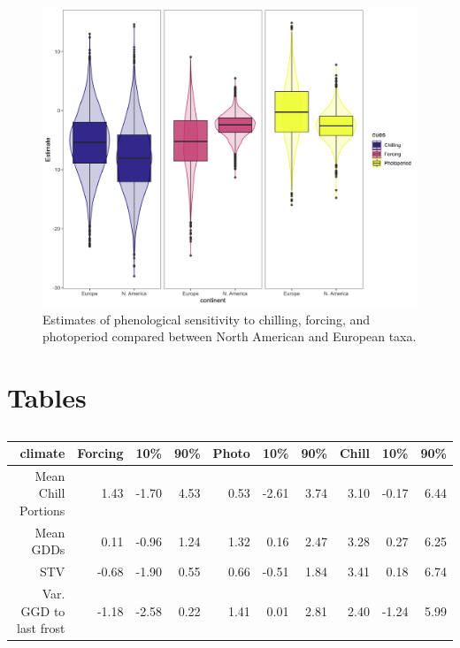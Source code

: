 \documentclass[12pt]{article}\usepackage[]{graphicx}\usepackage[]{color}
\begin{document}
\begin{figure}[h!]
    \centering
 \includegraphics[width=\textwidth]{..//..//analyses/ranges/figures/ontinental_cues.jpeg} 
    \caption{Estimates of phenological sensitivity to chilling, forcing, and photoperiod compared between North American and European taxa. }
    \label{fig:cuediff}
\end{figure}




\iffalse 

\section*{Tables}
\begin{table}
\centering
\begin{tabular}{|r|rrr|rrr|rrr|}
  \hline
  climate & Forcing & 10\% & 90\% & Photo & 10\% & 90\% & Chill & 10\% & 90\% \\ 
  \hline
 Mean Chill Portions & 1.43 & -1.70 & 4.53 & 0.53 & -2.61 & 3.74 & 3.10 & -0.17 & 6.44 \\ 
  Mean GDDs & 0.11 & -0.96 & 1.24 & 1.32 & 0.16 & 2.47 & 3.28 & 0.27 & 6.25 \\ 
   STV & -0.68 & -1.90 & 0.55 & 0.66 & -0.51 & 1.84 & 3.41 & 0.18 & 6.74 \\ 
   Var. GGD to last frost & -1.18 & -2.58 & 0.22 & 1.41 & 0.01 & 2.81 & 2.40 & -1.24 & 5.99 \\ 
   \hline
\end{tabular}
\label{tab:outfull}
\caption{}
\end{table}
\end{document}
